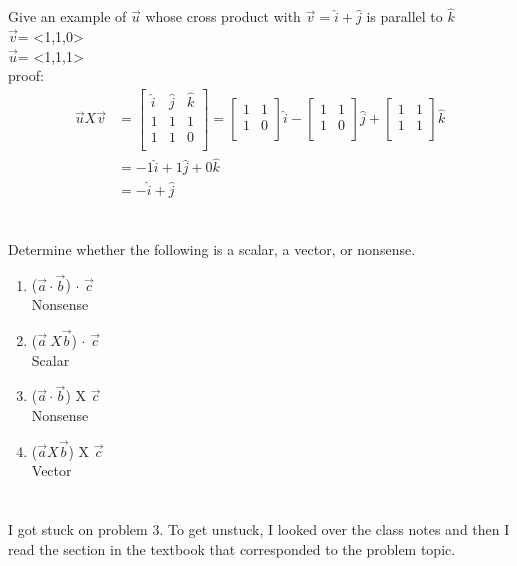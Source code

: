 \documentclass[a4paper]{article}
\begin{document}
\section{}
Give an example of $\vec{u}$ whose cross product with $\vec{v}=\hat{i}+\hat{j}$ is parallel to $\hat{k}$\\
$\vec{v}$= <1,1,0> \\
$\vec{u}$= <1,1,1>\\
proof: 
\begin{equation*}
\begin{split}
\vec{u}X \vec{v} &=
  \begin{bmatrix}
    \hat{i} & \hat{j} & \hat{k} \\
    1 & 1 & 1 \\
    1 & 1 & 0\\
  \end{bmatrix}
  = \begin{bmatrix}
    1 & 1 \\
    1 & 0 \\
  \end{bmatrix} \hat{i}-
  \begin{bmatrix}
    1 & 1 \\
    1 & 0 \\
  \end{bmatrix} \hat{j}+
  \begin{bmatrix}
    1 & 1 \\
    1 & 1 \\
  \end{bmatrix} \hat{k} \\
&=-1 \hat{i}+1\hat{j}+0\hat{k}  \\
&=-\hat{i}+\hat{j}
\end{split}
\end{equation*}

\section{}
Determine whether the following is a scalar, a vector, or nonsense. 
\begin{enumerate}[label=(\alph*)] 
    \item
    ($\vec{a}\cdot\vec{b}$) $\cdot$ $\vec{c}$ \\ Nonsense
    \item
    ($\vec{a}\ X \vec{b}$) $\cdot$ $\vec{c}$ \\ Scalar
    \item
    ($\vec{a}\cdot\vec{b}$) X $\vec{c}$ \\Nonsense
    \item
    ($\vec{a} X \vec{b}$) X $\vec{c}$ \\ Vector
\end{enumerate}
\section{}
I got stuck on problem 3. To get unstuck, I looked over the class notes and then I read the section in the textbook that corresponded to the problem topic. 
\end{document}
